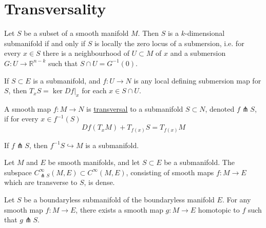 \chapter{Transversality} 
\label{appendix4}

\begin{thm}
	Let $S$ be a subset of a smooth manifold $M$. Then $S$ is a  $k$-dimensional
	submanifold if and only if  $S$ is locally the zero locus of a submersion,
	i.e. for every  $x\in S$ there is a neighbourhood of $U\subset M$ of $x$ and
	a submersion  $G : U \to \mathbb{R}^{n-k}$ such that $S\cap U = G^{-1}(0)$.
\end{thm}

\begin{thm}
	If $S \subset E$ is a submanifold, and $f: U \to N$ is any local defining
	submersion map for $S$, then $T_xS = \ker Df|_x$ for each $x\in S\cap U$.
\end{thm}

\begin{defn}
	A smooth map $f: M\to N$ is \underline{transversal} to a submanifold
	$S\subset N$, denoted $f \pitchfork S$, if for every $x\in f^{-1}(S)$ 
	\[
	Df(T_xM) + T_{f(x)}S = T_{f(x)}M
	\] 
\end{defn}

\begin{thm} 
	If $f \pitchfork S$, then  $f^{-1}S \hookrightarrow M$ is a 
	submanifold.
\end{thm}

\begin{thm}
	Let $M$ and $E$ be smooth manifolds, and let  $S\subset E$ be a submanifold. 
	The subspace $C^{\infty}_{\pitchfork S}(M,E) \subset C^{\infty}(M,E)$,
	consisting of smooth maps $f:M\to E$ which are transverse to  $S$, is dense.
\end{thm}
\begin{comment}
	This is equivalent to the following. For any smooth map $f: M\to E$ there
	exists a smooth embedding  $s:S\to E$ arbitrarily close to  $i:S\to E$, and
	for which  $f$ is transverse to  $s$. 
\end{comment}

\begin{thm}
	Let $S$ be a boundaryless submanifold of the boundaryless manifold  $E$. 
	For any smooth map $f: M\to E$, there exists a smooth map $g: M\to E$
	homotopic to  $f$ such that  $g \pitchfork S$.
\end{thm}
